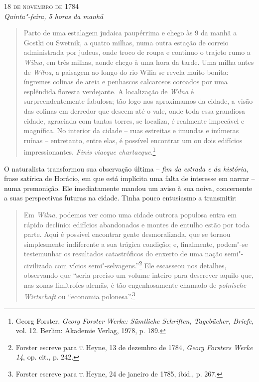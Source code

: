 \begin{flushright}
\smallskip\hfill\textsc{18 de novembro de 1784}\\
\textit{Quinta"-feira, 5 horas da manhã}
\end{flushright}
\begin{quote}
Parto de uma
estalagem judaica paupérrima e chego às 9 da manhã a Gostki
ou Swetnik, a quatro milhas, numa outra estação de correio administrada por judeus, onde
troco de roupa e continuo o trajeto rumo a \textit{Wilna}, em três milhas, aonde chego
à uma hora da tarde. Uma milha antes de \textit{Wilna}, a paisagem ao longo do
rio Wilia se revela muito bonita: íngremes colinas de areia e penhascos
calcarosos coroados por uma esplêndida floresta verdejante. A
localização de \textit{Wilna} é surpreendentemente fabulosa; tão logo nos
aproximamos da cidade, a visão das colinas em derredor que descem até o
vale, onde toda essa grandiosa cidade, agraciada com tantas torres, se
localiza, é realmente impecável e magnífica. No interior da cidade --
ruas estreitas e imundas e inúmeras ruínas -- entretanto, entre elas, é
possível encontrar um ou dois edifícios impressionantes. \textit{Finis
viaeque chartaeque}.\footnote{Georg Forster, \textit{Georg Forster Werke: Sämtliche Schriften, Tagebücher, Briefe}, vol. 12. Berlim: Akademie Verlag, 1978, p. 189.} 
\end{quote}

O naturalista transformou sua observação última -- \textit{fim da estrada e da
história}, frase satírica de Horácio, em que está implícita uma falta de
interesse em narrar -- numa premonição. Ele imediatamente mandou um
aviso à sua noiva, concernente a suas perspectivas futuras na cidade.
Tinha pouco entusiasmo a transmitir:

\begin{quote}
Em \textit{Wilna}, podemos ver como uma cidade outrora populosa entra em rápido
declínio: edifícios abandonados e montes de entulho estão por toda
parte. Aqui é possível encontrar gente desmoralizada, que se tornou
simplesmente indiferente a sua trágica condição; e, finalmente, podem"-se
testemunhar os resultados catastróficos do enxerto de uma nação
semi"-civilizada com vícios semi"-selvagens.''\footnote{Forster escreve para \textsc{t}.\,Heyne, 13 de dezembro de 1784, \textit{Georg Forsters Werke 14}, op. cit., p. 242.} Ele escasseou nos detalhes, observando que ``seria preciso um volume inteiro para descrever aquilo que, nas zonas
limítrofes alemãs, é tão engenhosamente chamado de \textit{polnische Wirtschaft} ou ``economia polonesa''.\footnote{Forster escreve para \textsc{t}.\,Heyne, 24 de janeiro de 1785, ibid., p. 267.}
\end{quote}

